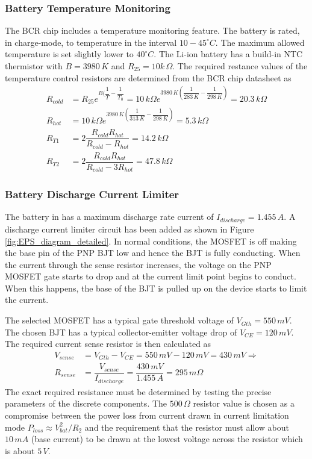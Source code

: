 \subsubsection{Battery Temperature Monitoring}
%
The \ac{BCR} chip includes a temperature monitoring feature. The battery is rated, in charge-mode, to temperature in the interval $10-45^{\circ}C$. The maximum allowed temperature is set slightly lower to $40^{\circ}C$. The Li-ion battery has a build-in \ac{NTC} thermistor with $B=3980\,K$ and $R_{25}=10k\,\Omega$. The required restance values of the temperature control resistors are determined from the \ac{BCR} chip datasheet as 
%
\begin{equation}
\begin{split}
R_{cold}&=R_{25}e^{B(\dfrac{1}{T}-\dfrac{1}{T_0}}=10\,k\Omega e^{3980\,K(\dfrac{1}{283	\,K}-\dfrac{1}{298\,K})}=20.3\,k\Omega\\
R_{hot}&=10\,k\Omega e^{3980\,K(\dfrac{1}{313	\,K}-\dfrac{1}{298\,K})}=5.3\,k\Omega\\
R_{T1}&=2\dfrac{R_{cold}R_{hot}}{R_{cold}-R_{hot}}=14.2\,k\Omega\\
R_{T2}&=2\dfrac{R_{cold}R_{hot}}{R_{cold}-3R_{hot}}=47.8\,k\Omega
\end{split}
\end{equation}

%
\subsubsection{Battery Discharge Current Limiter}
%
The battery in \cite{panasonic} has a maximum discharge rate current of $I_{discharge}=1.455\,A$. A discharge current limiter circuit has been added as shown in Figure \ref{fig:EPS_diagram_detailed}. In normal conditions, the MOSFET is off making the base pin of the \ac{PNP} \ac{BJT} low and hence the BJT is fully conducting. When the current through the sense resistor increases, the voltage on the PNP MOSFET gate starts to drop and at the current limit point begins to conduct. When this happens, the base of the BJT is pulled up on the device starts to limit the current.

The selected MOSFET has a typical gate threshold voltage of $V_{Gth}=550\,mV$. The chosen \ac{BJT} has a typical collector-emitter voltage drop of $V_{CE}=120\,mV$. The required current sense resistor is then calculated as 
%
\begin{equation}
\begin{split}
V_{sense}&=V_{Gth}-V_{CE}=550\,mV-120\,mV=430\,mV \Rightarrow\\
R_{sense}&=\dfrac{V_{sense}}{I_{discharge}}=\dfrac{430\,mV}{1.455\,A}=295\,m\Omega
\end{split}
\end{equation}
%
The exact required resistance must be determined by testing the precise parameters of the discrete components. The $500\,\Omega$ resistor value is chosen as a compromise between the power loss from current drawn in current limitation mode $P_{loss}\approx V_{bat}^2/R_2$ and the requirement that the resistor must allow about $10\,mA$ (base current) to be drawn at the lowest voltage across the resistor which is about $5\,V$.
%
%
%
